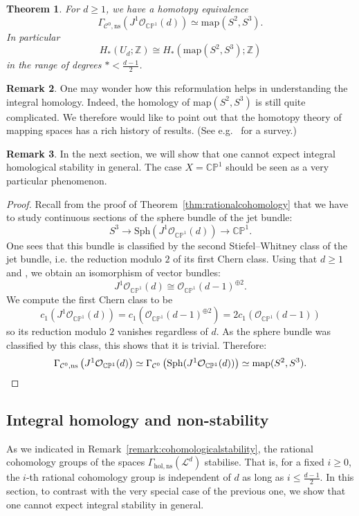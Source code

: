 \documentclass[a4paper]{amsart}
\newcommand{\bZ}{\mathbb Z}
\newcommand{\bC}{\mathbb C}
\newcommand{\bP}{\mathbb P}
\newcommand{\cC}{\mathcal C}
\newcommand{\cL}{\mathcal L}
\newcommand{\cO}{\mathcal O}
\newcommand{\lra}{\longrightarrow}
\newcommand\map{\mathrm{map}}
\newcommand{\Sph}{\mathrm{Sph}}
\theoremstyle{plain}
\newtheorem{theorem}{Theorem}[section]
\theoremstyle{definition}
\newtheorem{remark}[theorem]{Remark}
\begin{document}
\begin{theorem}
For $d \geq 1$, we have a homotopy equivalence
\[
    \Gamma_{\cC^0, \mathrm{ns}}\left( J^1\cO_{\bC\bP^1}(d) \right) \simeq \map(S^2,S^3).
\]
In particular
\[
    H_*(U_d; \bZ) \cong H_*(\map(S^2,S^3); \bZ)
\]
in the range of degrees $* < \frac{d-1}{2}$.
\end{theorem}

\begin{remark}
One may wonder how this reformulation helps in understanding the integral homology. Indeed, the homology of $\map(S^2,S^3)$ is still quite complicated. We therefore would like to point out that the homotopy theory of mapping spaces has a rich history of results. (See e.g.~\cite{smith_homotopy_2011} for a survey.)
\end{remark}

\begin{remark}
In the next section, we will show that one cannot expect integral homological stability in general. The case $X = \bC\bP^1$ should be seen as a very particular phenomenon.
\end{remark}

\begin{proof}
Recall from the proof of Theorem~\ref{thm:rationalcohomology} that we have to study continuous sections of the sphere bundle of the jet bundle:
\[
    S^3 \lra \Sph(J^1\cO_{\bC\bP^1}(d)) \lra \bC\bP^1.
\]
One sees that this bundle is classified by the second Stiefel--Whitney class of the jet bundle, i.e. the reduction modulo $2$ of its first Chern class. Using that $d \geq 1$ and \cite[Proposition 2.2]{di_rocco_line_2000}, we obtain an isomorphism of vector bundles:
\[
    J^1\cO_{\bC\bP^1}(d) \cong \cO_{\bC\bP^1}(d-1)^{\oplus 2}.
\]
We compute the first Chern class to be
\[
    c_1(J^1\cO_{\bC\bP^1}(d)) = c_1(\cO_{\bC\bP^1}(d-1)^{\oplus 2}) = 2 c_1(\cO_{\bC\bP^1}(d-1))
\]
so its reduction modulo $2$ vanishes regardless of $d$. As the sphere bundle was classified by this class, this shows that it is trivial. Therefore:
\[
    \Gamma_{\cC^0, \mathrm{ns}}\left( J^1\cO_{\bC\bP^1}(d) \right) \simeq \Gamma_{\cC^0}\left( \Sph(J^1\cO_{\bC\bP^1}(d)) \right) \simeq \map(S^2,S^3). \qedhere
\]
\end{proof}


\subsection{Integral homology and non-stability}

As we indicated in Remark~\ref{remark:cohomologicalstability}, the rational cohomology groups of the spaces $\Gamma_{\mathrm{hol,ns}}(\cL^d)$ stabilise. That is, for a fixed $i \geq 0$, the $i$-th rational cohomology group is independent of $d$ as long as $i \leq \frac{d-1}{2}$. In this section, to contrast with the very special case of the previous one, we show that one cannot expect integral stability in general. 
\end{document}
